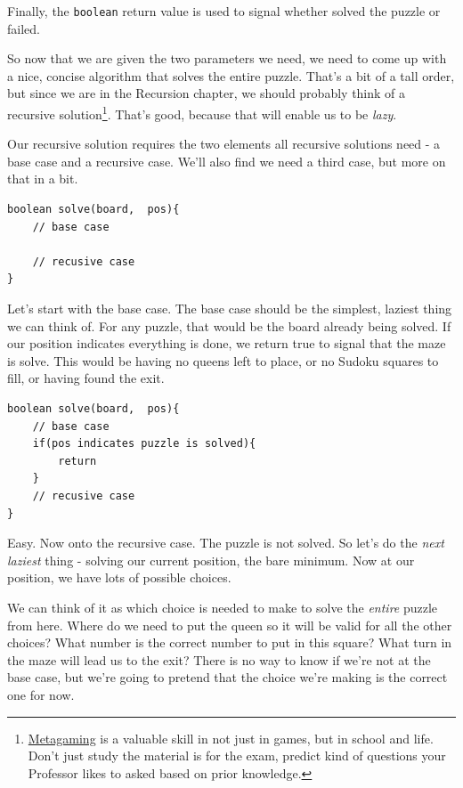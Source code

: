 Finally, the \texttt{boolean} return value is used to signal whether solved the puzzle or failed.

So now that we are given the two parameters we need, we need to come up with a nice, concise algorithm that solves the entire puzzle.  That's a bit of a tall order, but since we are in the Recursion chapter, we should probably think of a recursive solution\footnote{  \href{https://en.wikipedia.org/wiki/Metagame}{Metagaming} is a valuable skill in not just in games, but in school and life.  Don't just study the material is for the exam, predict kind of questions your Professor likes to asked based on prior knowledge.}.   That's good, because that will enable us to be \textit{lazy}.


Our recursive solution requires the two elements all recursive solutions need -  a base case and a recursive case.  We'll also find we need a third case, but more on that in a bit.


\begin{verbatim}
boolean solve(board,  pos){
	// base case
	
	// recusive case
}
\end{verbatim}

Let's start with the base case.  The base case should be the simplest, laziest thing we can think of.  For any puzzle, that would be the board already being solved.  If our position indicates everything is done, we return true to signal that the maze is solve.  This would be having no queens left to place, or no Sudoku squares to fill, or having found the exit.

\begin{verbatim}
boolean solve(board,  pos){
	// base case
	if(pos indicates puzzle is solved){
		return
	}
	// recusive case
}
\end{verbatim}

Easy.  Now onto the recursive case.  The puzzle is not solved.   So let's do the \textit{next laziest} thing  - solving our current position, the bare minimum.  Now at our position, we have lots of possible choices.    


We can think of it as which choice is needed to make to solve the \textit{entire} puzzle from here.  Where do we need to put the queen so it will be valid for all the other choices?  What number is the correct number to put in this square?  What turn in the maze will lead us to the exit?  There is no way to know if we're not at the base case, but we're going to pretend that the choice we're making is the correct one for now.

